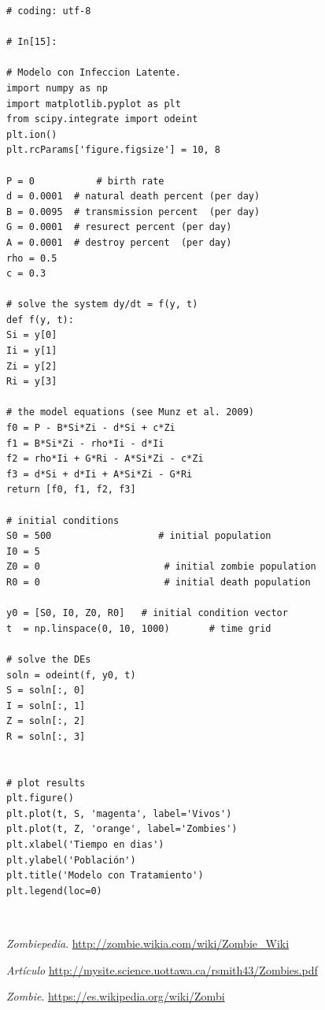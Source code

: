 \documentclass[12pt]{article}
\begin{document}
\begin{verbatim}
# coding: utf-8

# In[15]:

# Modelo con Infeccion Latente.
import numpy as np
import matplotlib.pyplot as plt
from scipy.integrate import odeint
plt.ion()
plt.rcParams['figure.figsize'] = 10, 8

P = 0           # birth rate
d = 0.0001  # natural death percent (per day)
B = 0.0095  # transmission percent  (per day)
G = 0.0001  # resurect percent (per day)
A = 0.0001  # destroy percent  (per day)
rho = 0.5
c = 0.3

# solve the system dy/dt = f(y, t)
def f(y, t):
Si = y[0]
Ii = y[1]
Zi = y[2]
Ri = y[3]

# the model equations (see Munz et al. 2009)
f0 = P - B*Si*Zi - d*Si + c*Zi
f1 = B*Si*Zi - rho*Ii - d*Ii
f2 = rho*Ii + G*Ri - A*Si*Zi - c*Zi
f3 = d*Si + d*Ii + A*Si*Zi - G*Ri
return [f0, f1, f2, f3]

# initial conditions
S0 = 500                   # initial population
I0 = 5
Z0 = 0                      # initial zombie population
R0 = 0                      # initial death population

y0 = [S0, I0, Z0, R0]   # initial condition vector
t  = np.linspace(0, 10, 1000)       # time grid

# solve the DEs
soln = odeint(f, y0, t)
S = soln[:, 0]
I = soln[:, 1]
Z = soln[:, 2]
R = soln[:, 3]


# plot results
plt.figure()
plt.plot(t, S, 'magenta', label='Vivos')
plt.plot(t, Z, 'orange', label='Zombies')
plt.xlabel('Tiempo en dias')
plt.ylabel('Población')
plt.title('Modelo con Tratamiento')
plt.legend(loc=0)
\end{verbatim}
\
\begin{thebibliography}{6}
	
	\emph{Zombiepedia}. 
	\url{http://zombie.wikia.com/wiki/Zombie_Wiki}
	
	
	\emph{Artículo}
	\url{http://mysite.science.uottawa.ca/rsmith43/Zombies.pdf}
		
		
	\emph{Zombie}. 
	\url{https://es.wikipedia.org/wiki/Zombi}	
	\end{thebibliography}
\end{document}
